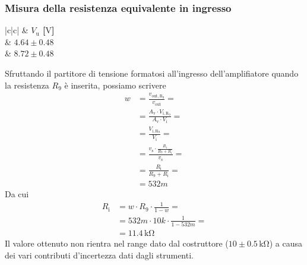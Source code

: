\documentclass[a4paper]{article}
\begin{document}
			\subsubsection{Misura della resistenza equivalente in ingresso}
				\begin{center}
					\begin{tabular}{ |c|c| }
						\hline
						\multirow{} 						 & \textbf{$ V_{\mathrm{u}} $ [$ \mathrm{V} $]} \\
						\hline
								 & $ 4.64 \pm 0.48 $ \\
						 & $ 8.72 \pm 0.48 $ \\
						\hline
					\end{tabular}
				\end{center}
				Sfruttando il partitore di tensione formatosi all'ingresso dell'amplifiatore quando la resistenza $ R_{9} $ è inserita, possiamo scrivere
				\begin{equation*}
					\begin{split}
						w &= \frac{v_{\mathrm{out,R_{9}}}}{v_{\mathrm{out}}} = \\
						  &= \frac{A_{\mathrm{v}} \cdot V_{\mathrm{i,R_{9}}}}{A_{\mathrm{v}} \cdot V_{\mathrm{i}}} = \\
						  &= \frac{V_{\mathrm{i,R_{9}}}}{V_{\mathrm{i}}} = \\
						  &= \frac{v_{\mathrm{s}} \cdot \frac{R_{\mathrm{i}}}{R_{9} + R_{\mathrm{i}}}}{v_{\mathrm{s}}} = \\
						  &= \frac{R_{\mathrm{i}}}{R_{9} + R_{\mathrm{i}}} = \\
						  &= 532m
					\end{split}
				\end{equation*}
				Da cui
				\begin{equation*}
					\begin{split}
						R_{\mathrm{i}} &= w \cdot R_{9} \cdot \frac{1}{1 - w} = \\
									   &= 532m \cdot 10k \cdot \frac{1}{1 - 532m} = \\
									   &= 11.4 \, \mathrm{k\Omega}
					\end{split}
				\end{equation*}
				Il valore ottenuto non rientra nel range dato dal costruttore ($ 10 \pm 0.5 \, \mathrm{k\Omega} $) a causa dei vari contributi d'incertezza dati dagli strumenti.
\end{document}
